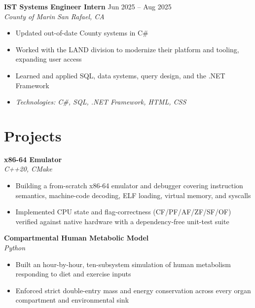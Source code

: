 \documentclass[10pt,letterpaper]{article}
\newcommand{\entry}[4]{%
    \textbf{#1} \hfill #2 \\
    \textit{#3} \hfill \textit{#4} \\
    \vspace{2pt}
}
\begin{document}
\vspace{4pt}

\entry
    {IST Systems Engineer Intern}
    {Jun 2025 -- Aug 2025}
    {County of Marin}
    {San Rafael, CA}

\begin{itemize}
    \item Updated out-of-date County systems in C\#
    \item Worked with the LAND division to modernize their platform and tooling, expanding user access
    \item Learned and applied SQL, data systems, query design, and the .NET Framework
    \item \textit{Technologies: C\#, SQL, .NET Framework, HTML, CSS}
\end{itemize}

\vspace{3pt}

\section*{Projects}

\entry
    {x86-64 Emulator}
    {}
    {C++20, CMake}
    {}

\begin{itemize}
    \item Building a from-scratch x86-64 emulator and debugger covering instruction semantics, machine-code decoding, ELF loading, virtual memory, and syscalls
    \item Implemented CPU state and flag-correctness (CF/PF/AF/ZF/SF/OF) verified against native hardware with a dependency-free unit-test suite
\end{itemize}

\vspace{4pt}

\entry
    {Compartmental Human Metabolic Model}
    {}
    {Python}
    {}

\begin{itemize}
    \item Built an hour-by-hour, ten-subsystem simulation of human metabolism responding to diet and exercise inputs
    \item Enforced strict double-entry mass and energy conservation across every organ compartment and environmental sink
\end{itemize}
\end{document}
